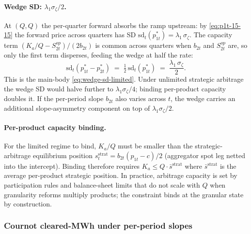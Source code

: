 \documentclass[11pt,a4paper]{article}
\theoremstyle{definition}
\theoremstyle{remark}
\theoremstyle{plain}
\begin{document}
\paragraph{Wedge SD: $\lambda_1\sigma_\zeta/2$.} At $(Q,Q)$ the per-quarter forward absorbs the ramp upstream: by \eqref{eq:p1t-15-15} the forward price across quarters has SD $\mathrm{sd}_t(p_{1t}^*) = \lambda_1\,\sigma_\zeta$. The capacity term $(K_a/Q - S^{op}_{2t})/(2 b_{2t})$ is common across quarters when $b_{2t}$ and $S^{op}_{2t}$ are, so only the first term disperses, feeding the wedge at half the rate:
\[
\boxed{\;\mathrm{sd}_t(p_{1t}^* - p_{2t}^*) \;=\; \tfrac{1}{2}\,\mathrm{sd}_t(p_{1t}^*) \;=\; \frac{\lambda_1\, \sigma_\zeta}{2}.\;}
\]
This is the main-body \eqref{eq:wedge-sd-limited}. Under unlimited strategic arbitrage the wedge SD would halve further to $\lambda_1\sigma_\zeta/4$; binding per-product capacity doubles it. If the per-period slope $b_{2t}$ also varies across $t$, the wedge carries an additional slope-asymmetry component on top of $\lambda_1\sigma_\zeta/2$.

\paragraph{Per-product capacity binding.} For the limited regime to bind, $K_a/Q$ must be smaller than the strategic-arbitrage equilibrium position $s_t^{\text{strat}} = b_{2t}(p_{1t}-c)/2$ (aggregator spot leg netted into the intercept). Binding therefore requires $K_a \le Q\cdot \bar s^{\text{strat}}$ where $\bar s^{\text{strat}}$ is the average per-product strategic position. In practice, arbitrage capacity is set by participation rules and balance-sheet limits that do not scale with $Q$ when granularity reforms multiply products; the constraint binds at the granular state by construction.

\subsubsection{Cournot cleared-MWh under per-period slopes}\label{app:15-15:scaleup}
\end{document}

